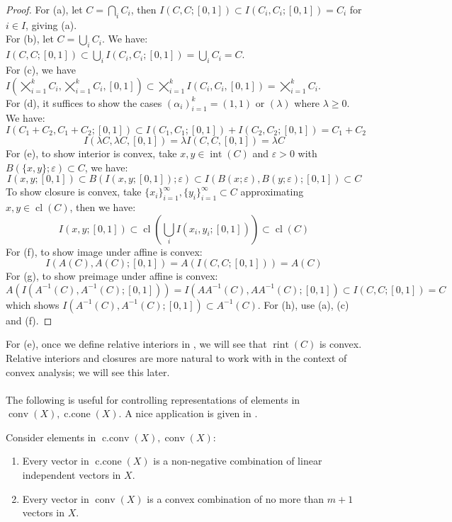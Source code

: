 \begin{proof}For (a), let $C=\bigcap_iC_i$, then $I(C,C;[0,1])\subset I(C_i,C_i;[0,1])=C_i$ for $i\in I$, giving (a).\\
	For (b), let $C=\bigcup_iC_i$. We have: $I(C,C;[0,1])\subset \bigcup_iI(C_i,C_i;[0,1])=\bigcup_iC_i=C$.\\
	For (c), we have $I(\bigtimes_{i=1}^kC_i,\bigtimes_{i=1}^kC_i,[0,1])\subset \bigtimes_{i=1}^kI(C_i,C_i,[0,1])=\bigtimes_{i=1}^kC_i$.\\
	For (d), it suffices to show the cases $(\alpha_i)_{i=1}^k=(1,1)$ or $(\lambda)$ where $\lambda \geq 0$. We have:
	\[
		I(C_1+C_2,C_1+C_2;[0,1])\subset I(C_1,C_1;[0,1])+I(C_2,C_2;[0,1])=C_1+C_2
	\]
	\[
		I(\lambda C,\lambda C,[0,1])=\lambda I(C,C,[0,1])=\lambda C
	\]
	For (e), to show interior is convex, take $x,y\in \operatorname{int}(C)$ and $\varepsilon>0$ with $B(\{x, y\};\varepsilon)\subset C$, we have:
	\[
		I(x, y;[0, 1])\subset B(I(x, y;[0, 1]);\varepsilon)\subset I(B(x;\varepsilon),B(y;\varepsilon); [0, 1])\subset C
	\]
	To show closure is convex, take $\{x_i\}_{i=1}^\infty,\{y_i\}_{i=1}^\infty\subset C$ approximating $x,y\in \operatorname{cl}(C)$, then we have:
	\[
		I(x,y;[0,1])\subset \operatorname{cl}\left(\bigcup_{i}I(x_i,y_i;[0,1])\right)\subset \operatorname{cl}(C)
	\]
	For (f), to show image under affine is convex:
	\[
		I(A(C),A(C);[0,1])=A(I(C,C;[0,1]))=A(C)
	\]
	For (g), to show preimage under affine is convex:
	\[
		A\left(I\left(A^{-1}(C),A^{-1}(C);[0,1]\right)\right)=I\left(AA^{-1}(C),AA^{-1}(C);[0,1]\right)\subset I(C,C;[0,1])=C
	\]
	which shows $I(A^{-1}(C),A^{-1}(C);[0,1])\subset A^{-1}(C)$. For (h), use (a), (c) and (f).
\end{proof}

\begin{rmrk}
	For (e), once we define relative interiors in , we will see that $\operatorname{rint}(C)$ is convex. Relative interiors and closures are more natural to work with in the context of convex analysis; we will see this later.
\end{rmrk}

\paragraph{}The following is useful for controlling representations of elements in $\operatorname{conv}(X),\operatorname{c.cone}(X)$. A nice application is given in .

\begin{prop}[Caratheodory]\label{prop:011-cara}
	Consider elements in $\operatorname{c.conv}(X),\operatorname{conv}(X)$:
	\begin{enumerate}[label=(\alph*)]
		\item Every vector in $\operatorname{c.cone}(X)$ is a non-negative combination of linear independent vectors in $X$.
		\item Every vector in $\operatorname{conv}(X)$ is a convex combination of no more than $m+1$ vectors in $X$.
	\end{enumerate}
\end{prop}

